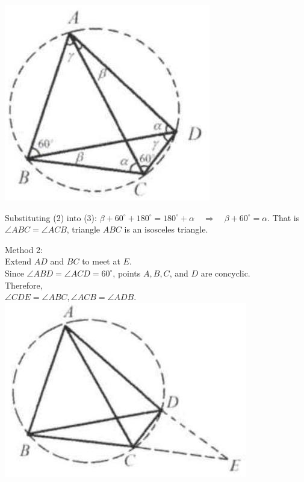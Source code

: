 \documentclass{article}
\begin{document}
\includegraphics[width=\textwidth]{images/196(3).jpg}


Substituting (2) into (3): \(\beta+60^{\circ}+180^{\circ}=180^{\circ}+\alpha \quad \Rightarrow \quad \beta+60^{\circ}=\alpha\). That is \(\angle A B C=\angle A C B\), triangle \(A B C\) is an isosceles triangle.

Method 2:\\
Extend \(A D\) and \(B C\) to meet at \(E\).\\
Since \(\angle A B D=\angle A C D=60^{\circ}\), points \(A, B, C\), and \(D\) are concyclic.\\
Therefore,\\
\(\angle C D E=\angle A B C, \angle A C B=\angle A D B\).\\
\centering
\includegraphics[width=\textwidth]{images/197.jpg}
\end{document}
